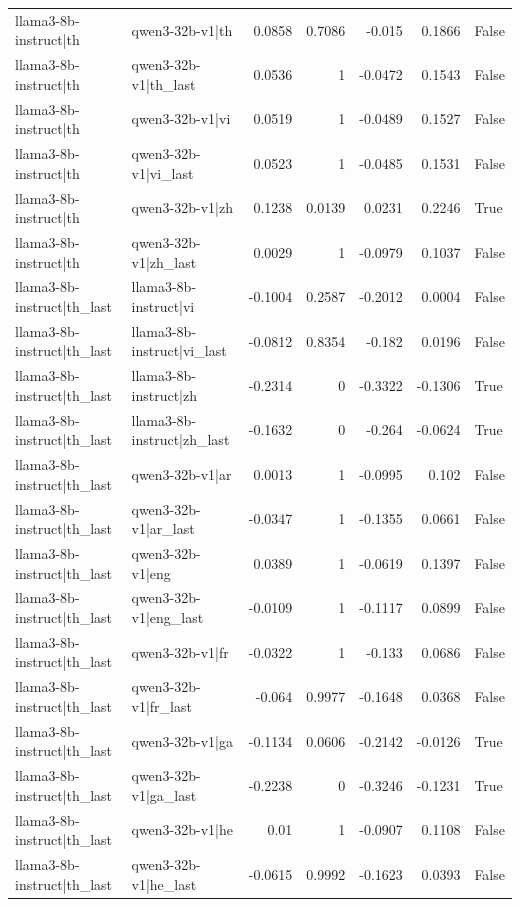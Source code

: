 \begin{table}
\begin{tabular}{l l r r r r l}
llama3-8b-instruct|th & qwen3-32b-v1|th & 0.0858 & 0.7086 & -0.015 & 0.1866 & False \\
llama3-8b-instruct|th & qwen3-32b-v1|th_last & 0.0536 & 1 & -0.0472 & 0.1543 & False \\
llama3-8b-instruct|th & qwen3-32b-v1|vi & 0.0519 & 1 & -0.0489 & 0.1527 & False \\
llama3-8b-instruct|th & qwen3-32b-v1|vi_last & 0.0523 & 1 & -0.0485 & 0.1531 & False \\
llama3-8b-instruct|th & qwen3-32b-v1|zh & 0.1238 & 0.0139 & 0.0231 & 0.2246 & True \\
llama3-8b-instruct|th & qwen3-32b-v1|zh_last & 0.0029 & 1 & -0.0979 & 0.1037 & False \\
llama3-8b-instruct|th_last & llama3-8b-instruct|vi & -0.1004 & 0.2587 & -0.2012 & 0.0004 & False \\
llama3-8b-instruct|th_last & llama3-8b-instruct|vi_last & -0.0812 & 0.8354 & -0.182 & 0.0196 & False \\
llama3-8b-instruct|th_last & llama3-8b-instruct|zh & -0.2314 & 0 & -0.3322 & -0.1306 & True \\
llama3-8b-instruct|th_last & llama3-8b-instruct|zh_last & -0.1632 & 0 & -0.264 & -0.0624 & True \\
llama3-8b-instruct|th_last & qwen3-32b-v1|ar & 0.0013 & 1 & -0.0995 & 0.102 & False \\
llama3-8b-instruct|th_last & qwen3-32b-v1|ar_last & -0.0347 & 1 & -0.1355 & 0.0661 & False \\
llama3-8b-instruct|th_last & qwen3-32b-v1|eng & 0.0389 & 1 & -0.0619 & 0.1397 & False \\
llama3-8b-instruct|th_last & qwen3-32b-v1|eng_last & -0.0109 & 1 & -0.1117 & 0.0899 & False \\
llama3-8b-instruct|th_last & qwen3-32b-v1|fr & -0.0322 & 1 & -0.133 & 0.0686 & False \\
llama3-8b-instruct|th_last & qwen3-32b-v1|fr_last & -0.064 & 0.9977 & -0.1648 & 0.0368 & False \\
llama3-8b-instruct|th_last & qwen3-32b-v1|ga & -0.1134 & 0.0606 & -0.2142 & -0.0126 & True \\
llama3-8b-instruct|th_last & qwen3-32b-v1|ga_last & -0.2238 & 0 & -0.3246 & -0.1231 & True \\
llama3-8b-instruct|th_last & qwen3-32b-v1|he & 0.01 & 1 & -0.0907 & 0.1108 & False \\
llama3-8b-instruct|th_last & qwen3-32b-v1|he_last & -0.0615 & 0.9992 & -0.1623 & 0.0393 & False \\

\end{tabular}
\end{table}
